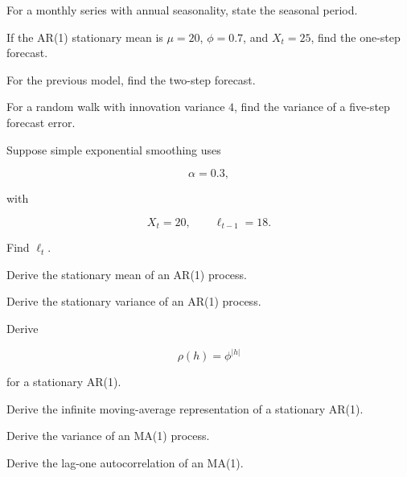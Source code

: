 \begin{exercise}[2]
For a monthly series with annual seasonality, state the seasonal period.
\end{exercise}

\begin{exercise}[2]
If the AR(1) stationary mean is \(\mu=20\), \(\phi=0.7\), and
\(X_t=25\), find the one-step forecast.
\end{exercise}

\begin{exercise}[2]
For the previous model, find the two-step forecast.
\end{exercise}

\begin{exercise}[2]
For a random walk with innovation variance \(4\), find the variance of a
five-step forecast error.
\end{exercise}

\begin{exercise}[2]
Suppose simple exponential smoothing uses

\[
\alpha=0.3,
\]

with

\[
X_t=20,
\qquad
\ell_{t-1}=18.
\]

Find \(\ell_t\).
\end{exercise}

\begin{exercise}[3]
Derive the stationary mean of an AR(1) process.
\end{exercise}

\begin{exercise}[3]
Derive the stationary variance of an AR(1) process.
\end{exercise}

\begin{exercise}[3]
Derive

\[
\rho(h)
=
\phi^{|h|}
\]

for a stationary AR(1).
\end{exercise}

\begin{exercise}[3]
Derive the infinite moving-average representation of a stationary AR(1).
\end{exercise}

\begin{exercise}[3]
Derive the variance of an MA(1) process.
\end{exercise}

\begin{exercise}[3]
Derive the lag-one autocorrelation of an MA(1).
\end{exercise}

